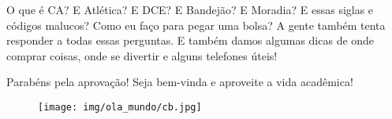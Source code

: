O que é CA? E Atlética? E DCE? E Bandejão? E Moradia? E essas siglas e códigos
malucos? Como eu faço para pegar uma bolsa? A gente também tenta responder a
todas essas perguntas. E também damos algumas dicas de onde comprar coisas,
onde se divertir e alguns telefones úteis!

Parabéns pela aprovação! Seja bem-vinda e aproveite a vida acadêmica!

\begin{figure}[t]
  \centering
  \texttt{[image: img/ola\_mundo/cb.jpg]}
\end{figure}
